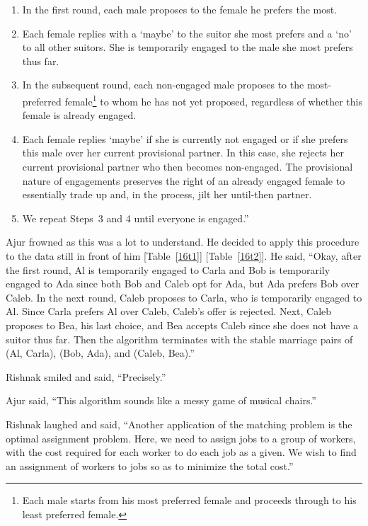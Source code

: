 \begin{enumerate}
    \item In the first round, each male proposes to the female he prefers the most.
    \item Each female replies with a `maybe' to the suitor she most prefers and a `no' to all other suitors. She is temporarily engaged to the male she most prefers thus far.
    \item In the subsequent round, each non-engaged male proposes to the most-preferred female\footnote{Each male starts from his most preferred female and proceeds through to his least preferred female.} to whom he has not yet proposed, regardless of whether this female is already engaged.
    \item Each female replies `maybe' if she is currently not engaged or if she prefers this male over her current provisional partner. In this case, she rejects her current provisional partner who then becomes non-engaged. The provisional nature of engagements preserves the right of an already engaged female to essentially trade up and, in the process, jilt her until-then partner.
   \item We repeat Steps~3 and 4 until everyone is engaged.''
\end{enumerate}

Ajur frowned as this was a lot to understand. He decided to apply this procedure to the data still in front of him [Table~\ref{16t1}] [Table~\ref{16t2}]. He said, ``Okay, after the first round, Al is temporarily engaged to Carla and Bob is temporarily engaged to Ada since both Bob and Caleb opt for Ada, but Ada prefers Bob over Caleb. In the next round, Caleb proposes to Carla, who is temporarily engaged to Al. Since Carla prefers Al over Caleb, Caleb's offer is rejected. Next, Caleb proposes to Bea, his last choice, and Bea accepts Caleb since she does not have a suitor thus far. Then the algorithm terminates with the stable marriage pairs of (Al, Carla), (Bob, Ada), and (Caleb, Bea).''

Rishnak smiled and said, ``Precisely.''

Ajur said, ``This algorithm sounds like a messy game of musical chairs.''

Rishnak laughed and said, ``Another application of the matching problem is the optimal assignment problem. Here, we need to assign jobs to a group of workers, with the cost required for each worker to do each job as a given. We wish to find an assignment of workers to jobs so as to minimize the total cost.''

